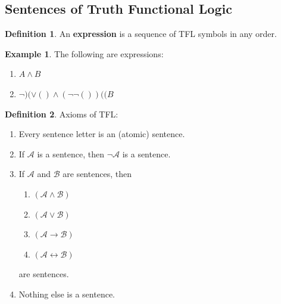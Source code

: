 \documentclass{tufte-handout}
\let\biconditional\leftrightarrow
\theoremstyle{definition}
\newtheorem{defn}{Definition}
\theoremstyle{example}
\newtheorem{exmp}{Example}
\theoremstyle{remark}
\begin{document}
\subsection{Sentences of Truth Functional Logic}
\begin{defn}
 An \textbf{expression} is a sequence of TFL symbols in any order.
\end{defn}
\begin{exmp}
  The following are expressions:
  \begin{enumerate}[leftmargin=3\parindent]
    \item $A \land B$
    \item $\neg )(\lor ()\land (\neg \neg ())((B$
    \end{enumerate}
\end{exmp}
\begin{framed}
  \begin{defn}
    Axioms of TFL\@:
    \begin{enumerate}[leftmargin=3\parindent]
      \item Every sentence letter is an (atomic) sentence.
      \item If $\mathcal{A}$ is a sentence, then $\neg \mathcal{A}$ is a sentence.
      \item If $\mathcal{A}$ and $\mathcal{B}$ are sentences, then 
      \begin{enumerate}[leftmargin=3\parindent, label=\roman*.]
        \item $(\mathcal{A} \land \mathcal{B})$ 
        \item $(\mathcal{A} \lor \mathcal{B})$
        \item $(\mathcal{A} \to \mathcal{B})$
        \item $(\mathcal{A} \biconditional \mathcal{B})$
      \end{enumerate}
      are sentences.
      \item Nothing else is a sentence.
    \end{enumerate}
  \end{defn}
\end{framed}
\end{document}
